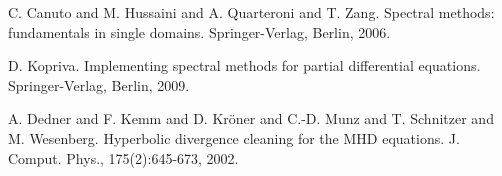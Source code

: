 
\begin{thebibliography}{10}

{\sc C. Canuto and M. Hussaini and A. Quarteroni and T. Zang}. {Spectral methods: fundamentals in single domains}. Springer-Verlag, Berlin, 2006.



{\sc D. Kopriva}. {Implementing spectral methods for partial differential equations}. Springer-Verlag, Berlin, 2009.



{\sc A. Dedner and F. Kemm and D. Kr{\"{o}}ner and C.-D. Munz and T. Schnitzer and M. Wesenberg}. {Hyperbolic divergence cleaning for the {MHD} equations}. J. Comput. Phys., 175(2):645-673, 2002.

\end{thebibliography}

